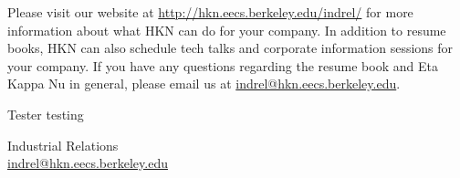 \documentclass[11pt]{article}
\begin{document}
Please visit our website at \url{http://hkn.eecs.berkeley.edu/indrel/} for more information about what HKN can do for
your company. In addition to resume books, HKN can also schedule tech talks and corporate information
sessions for your company. If you have any questions regarding the resume book and Eta Kappa Nu in
general, please email us at \url{indrel@hkn.eecs.berkeley.edu}.
    \begin{list}{}{\setlength{\itemsep}{-2mm} \setlength{\leftmargin}{0pt}}
    
        \item{Tester testing}
    
    \end{list}

Industrial Relations \\
\url{indrel@hkn.eecs.berkeley.edu}
\end{document}
